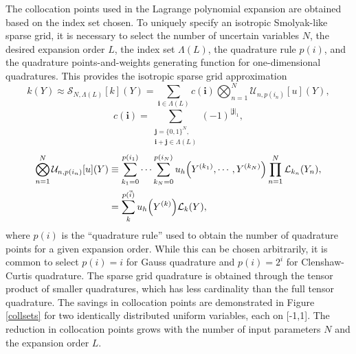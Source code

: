 \documentclass[11pt]{article}
\begin{document}
The collocation points used in the Lagrange polynomial expansion are obtained based on the index set chosen.  To uniquely specify an isotropic Smolyak-like sparse grid, it is necessary to select the number of uncertain variables $N$, the desired expansion order $L$, the index set $\Lambda(L)$, the quadrature rule $p(i)$, and the quadrature points-and-weights generating function for one-dimensional quadratures.
This provides the isotropic sparse grid approximation
\begin{equation}
k(Y)\approx\mathcal{S}_{N,\Lambda(L)}[k](Y)=\sum_{\boldsymbol{i}\in\Lambda(L)}c(\boldsymbol{i})\bigotimes_{n=1}^N\mathcal{U}_{n,p(i_n)}[u](Y),
\end{equation}
\begin{equation}
c(\boldsymbol{i})=\sum_{\substack{\boldsymbol{j}=\{0,1\}^N,\\ \boldsymbol{i}+\boldsymbol{j}\in\Lambda(L)}}(-1)^{|\boldsymbol{j}|_1},
\end{equation}
\begin{align}
\bigotimes_{n=1}^N\mathcal{U}_{n,p(i_n)}[u](Y)&\equiv\sum_{k_1=0}^{p(i_1)}\cdots\sum_{k_N=0}^{p(i_N)}u_h\qty(Y^{(k_1)},\cdots,Y^{(k_N)})\prod_{n=1}^N \mathcal{L}_{k_n}(Y_n),\\
  &=\sum_{k}^{p(\vec i)}u_h\qty(Y^{(k)})\mathcal{L}_k(Y),
\end{align}
where $p(i)$ is the ``quadrature rule'' used to obtain the number of quadrature points for a given expansion order.  While this can be chosen arbitrarily, it is common to select $p(i)=i$ for Gauss quadrature and $p(i)=2^i$ for Clenshaw-Curtis quadrature.
The sparse grid quadrature is obtained through the tensor product of smaller quadratures, which has less cardinality than the full tensor quadrature.  The savings in collocation points are demonstrated in Figure \ref{collsets} for two identically distributed uniform variables, each on [-1,1].  The reduction in collocation points grows with the number of input parameters $N$ and the expansion order $L$.  \\
\end{document}

